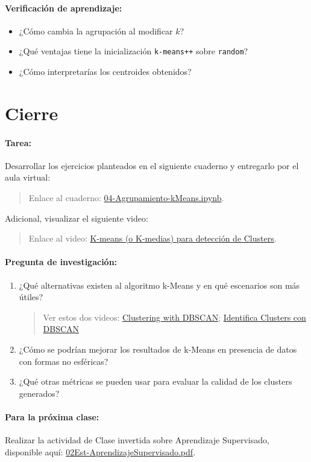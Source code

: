 \documentclass[a4,11pt]{aleph-notas}
\begin{document}
\paragraph{Verificación de aprendizaje:}  
\begin{itemize}[leftmargin=*]
    \item ¿Cómo cambia la agrupación al modificar \(k\)?
    \item ¿Qué ventajas tiene la inicialización \texttt{k-means++} sobre \texttt{random}?
    \item ¿Cómo interpretarías los centroides obtenidos?
\end{itemize}

\section*{Cierre}

\paragraph{Tarea:}
    Desarrollar los ejercicios planteados en el siguiente cuaderno y entregarlo por el aula virtual:
    \begin{quote}
        Enlace al cuaderno: \href{https://colab.research.google.com/github/andres-merino/AprendizajeAutomaticoInicial-05-N0105/blob/main/2-Ejercicios/03-Agrupamiento-Jerarquico.ipynb}{04-Agrupamiento-kMeans.ipynb}.
    \end{quote}
    Adicional, visualizar el siguiente video:
    \begin{quote}
        Enlace al video: \href{https://youtu.be/mICySHB0fh4?si=YuMBh5uQs4xyRt5u}{K-means (o K-medias) para detección de Clusters}.
    \end{quote}


\paragraph{Pregunta de investigación:}  
\begin{enumerate}[leftmargin=*]
    \item ¿Qué alternativas existen al algoritmo k-Means y en qué escenarios son más útiles?
    \begin{quote}
        Ver estos dos videos: \href{https://www.youtube.com/watch?v=RDZUdRSDOok}{Clustering with DBSCAN}; \href{https://www.youtube.com/watch?v=HMis89lGdkA}{Identifica Clusters con DBSCAN}
    \end{quote}
    \item ¿Cómo se podrían mejorar los resultados de k-Means en presencia de datos con formas no esféricas?
    \item ¿Qué otras métricas se pueden usar para evaluar la calidad de los clusters generados?
\end{enumerate}

\paragraph{Para la próxima clase:}  
Realizar la actividad de Clase invertida sobre Aprendizaje Supervisado, disponible aquí: \href{https://andres-merino.github.io/AprendizajeAutomaticoInicial-05-N0105/2-ClaseInvertida/02Est-AprendizajeSupervisado.pdf}{02Est-AprendizajeSupervisado.pdf}.
\end{document}

